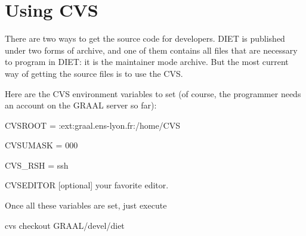 

\section{Using CVS}

There are two ways to get the source code for developers. DIET is published
under two forms of archive, and one of them contains all files that are
necessary to program in DIET: it is the maintainer mode archive. But the most
current way of getting the source files is to use the CVS.

Here are the CVS environment variables to set (of course, the programmer needs
an account on the GRAAL server so far):
\begin{description}
\item{\sf CVSROOT} \textsf{ = :ext:graal.ens-lyon.fr:/home/CVS}
\item{\sf CVSUMASK} \textsf{ = 000}
\item{\sf CVS\_RSH} \textsf{ = ssh}
\item{\sf CVSEDITOR [optional]} your favorite editor.
\end{description}

Once all these variables are set, just execute\\
\centerline{\sf cvs checkout GRAAL/devel/diet}\\


